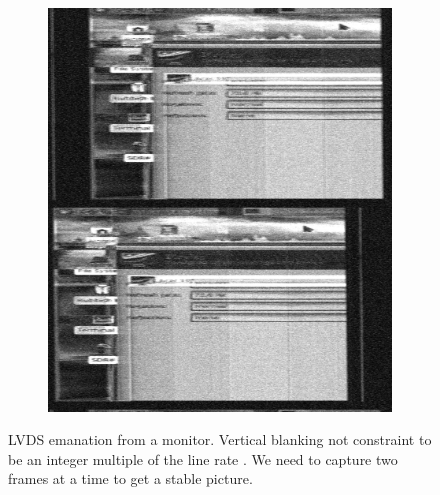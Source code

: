 \documentclass[a4paper,12pt,twoside,openright]{report}
\begin{document}
\begin{figure}[h!]
\centering
\begin{subfigure}[b]{0.45\textwidth}
  \includegraphics[width=\textwidth]{screen_lvds}
\end{subfigure}
  \caption{LVDS emanation from a monitor. Vertical blanking not constraint to be an integer multiple of the line rate \cite{kuhn2011compromising}. We need to capture two frames at a time to get a stable picture.}
  \label{fig:screenlvds}
  

\end{figure}
\end{document}
